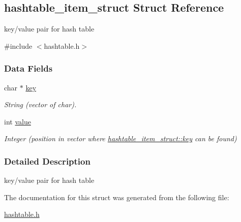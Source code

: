 \hypertarget{structhashtable__item__struct}{}\subsection{hashtable\+\_\+item\+\_\+struct Struct Reference}
\label{structhashtable__item__struct}


key/value pair for hash table  




{\ttfamily \#include $<$hashtable.\+h$>$}

\subsubsection*{Data Fields}
\begin{DoxyCompactItemize}
\item 
\mbox{\label{structhashtable__item__struct_a69e66635eb50b52a33f677684e9e9ea8}} 
char $\ast$ \hyperlink{structhashtable__item__struct_a69e66635eb50b52a33f677684e9e9ea8}{key}
\begin{DoxyCompactList}\small\item\em String (vector of char). \end{DoxyCompactList}\item 
\mbox{\label{structhashtable__item__struct_adf2cf000a4deead466a3d40e99a4c913}} 
int \hyperlink{structhashtable__item__struct_adf2cf000a4deead466a3d40e99a4c913}{value}
\begin{DoxyCompactList}\small\item\em Integer (position in vector where \hyperlink{structhashtable__item__struct_a69e66635eb50b52a33f677684e9e9ea8}{hashtable\+\_\+item\+\_\+struct\+::key} can be found) \end{DoxyCompactList}\end{DoxyCompactItemize}


\subsubsection{Detailed Description}
key/value pair for hash table 

The documentation for this struct was generated from the following file\+:\begin{DoxyCompactItemize}
\item 
\hyperlink{hashtable_8h}{hashtable.\+h}\end{DoxyCompactItemize}
